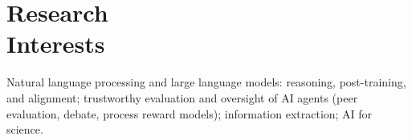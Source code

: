 \section{Research \\ Interests}

\noindent Natural language processing and large language models: reasoning, post-training, and alignment; trustworthy evaluation and oversight of AI agents (peer evaluation, debate, process reward models); information extraction; AI for science.
